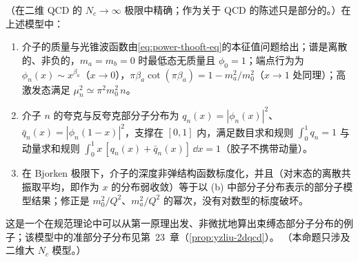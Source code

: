 \begin{proposition}\label{prop:power-thooft-model}
（在二维 QCD 的 $N_c\to\infty$ 极限中精确；作为关于 QCD 的陈述只是部分的。）在上述模型中：
\begin{enumerate}[label=(\alph*),leftmargin=2em,itemsep=1pt,topsep=2pt]
\item 介子的质量与光锥波函数由\eqref{eq:power-thooft-eq}的本征值问题给出；谱是离散的、非负的，$m_a=m_b=0$ 时最低态无质量且 $\phi_0=1$；端点行为为 $\phi_n(x)\sim x^{\beta_a}$（$x\to0$），$\pi\beta_a\cot(\pi\beta_a)=1-m_a^2/m_0^2$（$x\to1$ 处同理）；高激发态满足 $\mu_n^2\simeq\pi^2m_0^2\,n$。
\item 介子 $n$ 的夸克与反夸克部分子分布为 $q_n(x)=|\phi_n(x)|^2$、$\bar q_n(x)=|\phi_n(1-x)|^2$，支撑在 $[0,1]$ 内，满足数目求和规则 $\int_0^1q_n=1$ 与动量求和规则 $\int_0^1x\,[q_n(x)+\bar q_n(x)]\,\dd x=1$（胶子不携带动量）。
\item 在 Bjorken 极限下，介子的深度非弹结构函数标度化，并且（对末态的离散共振取平均，即作为 $x$ 的分布弱收敛）等于以 (b) 中部分子分布表示的部分子模型结果；修正是 $m_0^2/Q^2$、$m_a^2/Q^2$ 的幂次，没有对数型的标度破坏\cite{Einhorn1976}。
\end{enumerate}
这是一个在规范理论中可以从第一原理出发、非微扰地算出束缚态部分子分布的例子；该模型中的准部分子分布见第~23~章（\cref{prop:yzliu-2dqcd}）。
（本命题只涉及二维大 $N_c$ 模型。）
\end{proposition}

